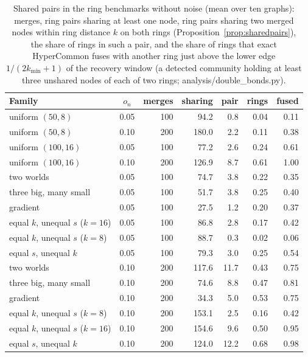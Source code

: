 \begin{table}[t]
\caption{Shared pairs in the ring benchmarks without noise (mean over ten graphs): merges, ring pairs sharing at least one node, ring pairs sharing two merged nodes within ring distance $k$ on both rings (Proposition~\ref{prop:sharedpairs}), the share of rings in such a pair, and the share of rings that exact HyperCommon fuses with another ring just above the lower edge $1/(2k_{\min}+1)$ of the recovery window (a detected community holding at least three unshared nodes of each of two rings; analysis/double\_bonds.py).}
\label{tab:doublebonds}
\scriptsize\setlength{\tabcolsep}{2pt}
\begin{ruledtabular}
\begin{tabular}{lcrrrrr}
Family & $o_n$ & merges & sharing & pair & rings & fused \\
\hline
uniform $(50,8)$ & 0.05 & 100 & 94.2 & 0.8 & 0.04 & 0.11 \\
uniform $(50,8)$ & 0.10 & 200 & 180.0 & 2.2 & 0.11 & 0.38 \\
uniform $(100,16)$ & 0.05 & 100 & 77.2 & 2.6 & 0.24 & 0.61 \\
uniform $(100,16)$ & 0.10 & 200 & 126.9 & 8.7 & 0.61 & 1.00 \\
two worlds & 0.05 & 100 & 74.7 & 3.8 & 0.22 & 0.35 \\
three big, many small & 0.05 & 100 & 51.7 & 3.8 & 0.25 & 0.40 \\
gradient & 0.05 & 100 & 27.5 & 1.2 & 0.20 & 0.37 \\
equal $k$, unequal $s$ ($k{=}16$) & 0.05 & 100 & 86.8 & 2.8 & 0.17 & 0.42 \\
equal $k$, unequal $s$ ($k{=}8$) & 0.05 & 100 & 88.7 & 0.3 & 0.02 & 0.06 \\
equal $s$, unequal $k$ & 0.05 & 100 & 79.3 & 3.0 & 0.25 & 0.54 \\
two worlds & 0.10 & 200 & 117.6 & 11.7 & 0.43 & 0.75 \\
three big, many small & 0.10 & 200 & 74.6 & 8.8 & 0.47 & 0.81 \\
gradient & 0.10 & 200 & 34.3 & 5.0 & 0.53 & 0.75 \\
equal $k$, unequal $s$ ($k{=}8$) & 0.10 & 200 & 153.1 & 2.5 & 0.16 & 0.42 \\
equal $k$, unequal $s$ ($k{=}16$) & 0.10 & 200 & 154.6 & 9.6 & 0.50 & 0.95 \\
equal $s$, unequal $k$ & 0.10 & 200 & 124.0 & 12.2 & 0.68 & 0.98 \\
\end{tabular}
\end{ruledtabular}
\end{table}
